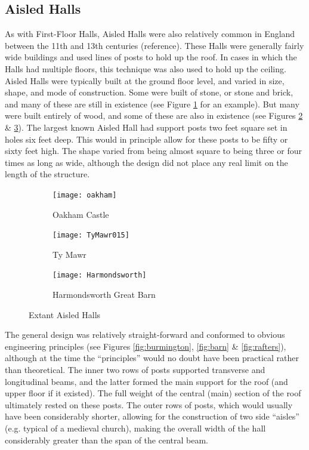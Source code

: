 \documentclass[letterpaper,11pt,titlepage]{article}
\begin{document}
{\subsection{Aisled Halls}
As with First-Floor Halls, Aisled Halls were also relatively common in England between the 11th and 13th centuries (reference). These Halls were generally fairly wide buildings and used lines of posts to hold up the roof. In cases in which the Halls had multiple floors, this technique was also used to hold up the ceiling. Aisled Halls were typically built at the ground floor level, and varied in size, shape, and mode of construction. Some were built of stone, or stone and brick, and many of these are still in existence (see Figure \ref{fig:oakham} for an example). But many were built entirely of wood, and some of these are also in existence (see Figures \ref{fig:tymawr} \& \ref{fig:greatbarn}). The largest known Aisled Hall had support posts two feet square set in holes six feet deep. This would in principle allow for these posts to be fifty or sixty feet high. The shape varied from being almost square to being three or four times as long as wide, although the design did not place any real limit on the length of the structure.

\begin{figure}
	\centering
	\begin{subfigure}[b]{0.3\textwidth}
		\texttt{[image: oakham]}
		\caption{Oakham Castle}
		\label{fig:oakham}
	\end{subfigure}
	\begin{subfigure}[b]{0.3\textwidth}
		\texttt{[image: TyMawr015]}
		\caption{Ty Mawr}
		\label{fig:tymawr}
	\end{subfigure}
	\begin{subfigure}[b]{0.3\textwidth}
		\texttt{[image: Harmondsworth]}
		\caption{Harmondsworth Great Barn}
		\label{fig:greatbarn}
	\end{subfigure}
	\caption{Extant Aisled Halls}\label{fig:aisled}
\end{figure}

The general design was relatively straight-forward and conformed to obvious engineering principles (see Figures \ref{fig:burmington}, \ref{fig:barn} \& \ref{fig:rafters}), although at the time the ``principles'' would no doubt have been practical rather than theoretical. The inner two rows of posts supported transverse and longitudinal beams, and the latter formed the main support for the roof (and upper floor if it existed). The full weight of the central (main) section of the roof ultimately rested on these posts. The outer rows of posts, which would usually have been considerably shorter, allowing for the construction of two side ``aisles'' (e.g. typical of a medieval church), making the overall width of the hall considerably greater than the span of the central beam.

}
\end{document}
